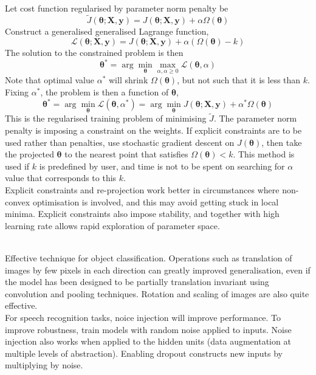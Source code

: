 \begin{remark} \\
Let cost function regularised by parameter norm penalty be
\begin{equation}
\tilde{J}(\bm{\theta}; \bm{X}, \bm{y}) = J(\bm{\theta}; \bm{X}, \bm{y}) + \alpha \Omega(\bm{\theta}) \nonumber
\end{equation}
Construct a generalised generalised Lagrange function,
\begin{equation}
\mathcal{L}(\bm{\theta}; \bm{X}, \bm{y}) = J(\bm{\theta}; \bm{X}, \bm{y}) + \alpha (\Omega(\bm{\theta}) - k) \nonumber
\end{equation}
The solution to the constrained problem is then
\begin{equation}
\bm{\theta}^* = \arg \min_{\bm{\theta}} \max_{\alpha, \alpha \geq 0} \mathcal{L} (\bm{\theta}, \alpha) \nonumber
\end{equation}
Note that optimal value $\alpha^*$ will shrink $\Omega(\bm{\theta})$, but not such that it is less than $k$.\\
Fixing $\alpha^*$, the problem is then a function of $\bm{\theta}$,
\begin{equation}
\bm{\theta}^* = \arg \min_{\bm{\theta}} \mathcal{L} (\bm{\theta}, \alpha^*) = \arg \min_{\bm{\theta}} J(\bm{\theta}; \bm{X}, \bm{y}) + \alpha^* \Omega (\bm{\theta}) \nonumber
\end{equation}
This is the regularised training problem of minimising $\tilde{J}$. The parameter norm penalty is imposing a constraint on the weights. If explicit constraints are to be used rather than penalties, use stochastic gradient descent on $J(\bm{\theta})$, then take the projected $\bm{\theta}$ to the nearest point that satisfies $\Omega(\bm{\theta}) < k$. This method is used if $k$ is predefined by user, and time is not to be spent on searching for $\alpha$ value that corresponds to this $k$.\\
Explicit constraints and re-projection work better in circumstances where non-convex optimisation is involved, and this may avoid getting stuck in local minima. Explicit constraints also impose stability, and together with high learning rate allows rapid exploration of parameter space.
\end{remark}

\begin{remark} \\
Effective technique for object classification. Operations such as translation of images by few pixels in each direction can greatly improved generalisation, even if the model has been designed to be partially translation invariant using convolution and pooling techniques. Rotation and scaling of images are also quite effective.\\
For speech recognition tasks, noice injection will improve performance. To improve robustness, train models with random noise applied to inputs. Noise injection also works when applied to the hidden units (data augmentation at multiple levels of abstraction). Enabling dropout constructs new inputs by multiplying by noise.
\end{remark}

